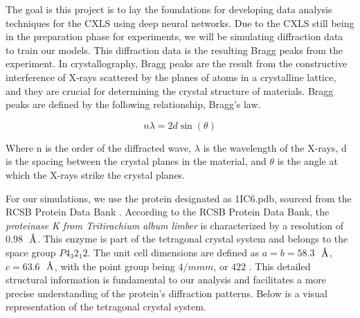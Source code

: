 \documentclass[12pt]{article}
\begin{document}
The goal is this project is to lay the foundations for developing data analysis techniques for the CXLS using deep neural networks. Due to the CXLS still being in the preparation phase for experiments, we will be simulating diffraction data to train our models. This diffraction data is the resulting Bragg peaks from the experiment. In crystallography, Bragg peaks are the result from the constructive interference of X-rays scattered by the planes of atoms in a crystalline lattice, and they are crucial for determining the crystal structure of materials. Bragg peaks are defined by the following relationship, Bragg's law.

\begin{equation}
    n\lambda = 2d\sin(\theta)
\end{equation}

Where n is the order of the diffracted wave, $\lambda$ is the wavelength of the X-rays, d is the spacing between the crystal planes in the material, and $\theta$ is the angle at which the X-rays strike the crystal planes.

For our simulations, we use the protein designated as 1IC6.pdb, sourced from the RCSB Protein Data Bank \cite{rcsb}. According to the RCSB Protein Data Bank, the \textit{proteinase K from Tritirachium album limber} is characterized by a resolution of 0.98 $\textup{~\AA}$. This enzyme is part of the tetragonal crystal system and belongs to the space group $P 4_3 2_1 2$\cite{rcsb}. The unit cell dimensions are defined as $a = b = 58.3$ $\textup{~\AA}$, $c = 63.6$ $\textup{~\AA}$, with the point group being $4/mmm$, or $422$ \cite{rcsb}. This detailed structural information is fundamental to our analysis and facilitates a more precise understanding of the protein's diffraction patterns. Below is a visual representation of the tetragonal crystal system\cite{tetragonal}.
\end{document}
